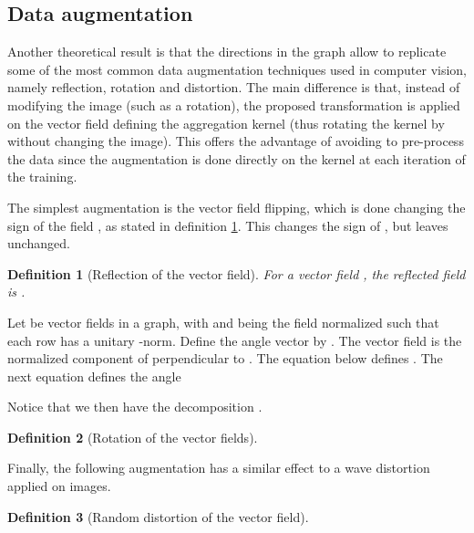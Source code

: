 \documentclass{article} \usepackage{arxiv,times}
\newtheorem{definition}{Definition}
\begin{document}
\subsection{Data augmentation}\label{sec:data-augmentation}

Another theoretical result is that the directions in the graph allow to replicate some of the most common data augmentation techniques used in computer vision, namely reflection, rotation and distortion. The main difference is that, instead of modifying the image (such as a  rotation), the proposed transformation is applied on the vector field defining the aggregation kernel (thus rotating the kernel by  without changing the image). This offers the advantage of avoiding to pre-process the data since the augmentation is done directly on the kernel at each iteration of the training.

The simplest augmentation is the vector field flipping, which is done changing the sign of the field , as stated in definition \ref{def:field_flip}. This changes the sign of , but leaves  unchanged.

 \begin{definition}[Reflection of the vector field]
\label{def:field_flip}
For a vector field , the reflected field is .
\end{definition}

Let   be vector fields in a graph, with  and  being the field normalized such that each row has a unitary -norm. Define the angle vector  by . The vector field  is the normalized component of  perpendicular to . The equation below defines . The next equation defines the angle 


Notice that we then have the decomposition .


\begin{definition}[Rotation of the vector fields]
\label{def:field_rotation}
\end{definition}



Finally, the following augmentation has a similar effect to a wave distortion applied on images.

\begin{definition}[Random distortion of the vector field]
\label{def:field_distortion}
\end{definition}
\end{document}
